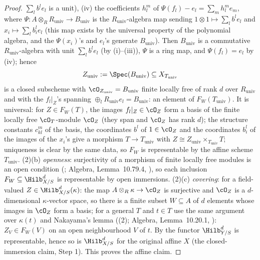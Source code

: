 \begin{proof}
$\sum_lb^le_l$ is a unit),
(iv) the coefficients $h^m_l$ of $\Psi(f_l)-e_l=\sum_mh^m_le_m$,
where $\Psi:A\otimes_RR_{\mathrm{univ}}\to B_{\mathrm{univ}}$ is the
$R_{\mathrm{univ}}$-algebra map sending $1\otimes1\mapsto\sum_lb^le_l$
and $x_i\mapsto\sum_lb^l_ie_l$ (this map exists by the universal
property of the polynomial algebra, and the
$\Psi(x_i)$'s and $e_l$'s generate $B_{\mathrm{univ}}$).
Then $B_{\mathrm{univ}}$ is a commutative $R_{\mathrm{univ}}$-algebra
with unit $\sum_lb^le_l$ (by (i)--(iii)), $\Psi$ is a ring map, and
$\Psi(f_l)=e_l$ by (iv); hence
\[
Z_{\mathrm{univ}}:=\Spec(B_{\mathrm{univ}})\subseteq
X_{T_{\mathrm{univ}}}
\]
is a closed subscheme with $\cO_{Z_{\mathrm{univ}}}=B_{\mathrm{univ}}$
finite locally free of rank $d$ over $R_{\mathrm{univ}}$ and with the
$f_l|_Z$'s spanning
$\oplus_lR_{\mathrm{univ}}e_l=B_{\mathrm{univ}}$: an element of
$F_W(T_{\mathrm{univ}})$.  It is universal: for $Z\in F_W(T)$, the
images $f_l|_Z\in\cO_Z$ form a basis of the finite locally free
$\cO_T$-module $\cO_Z$ (they span and $\cO_Z$ has rank $d$); the
structure constants $c^m_{kl}$ of the basis, the coordinates $b^l$ of
$1\in\cO_Z$ and the coordinates
$b^l_i$ of the images of the $x_i$'s give a morphism $T\to
T_{\mathrm{univ}}$ with $Z\cong Z_{\mathrm{univ}}\times_{T_{\mathrm{univ}}}T$;
uniqueness is clear by the same data, so $F_W$ is representable by the
affine scheme $T_{\mathrm{univ}}$.  (2)(b) \emph{openness}: surjectivity
of a morphism of finite locally free modules is an open condition
(; Algebra, Lemma~10.79.4,
), so each
inclusion $F_W\subseteq\Hilb^d_{X/S}$ is representable by open
immersions.  (2)(c) \emph{covering}: for a field-valued $Z\in
\Hilb^d_{X/S}(\kappa)$: the map $A\otimes_R\kappa\to\cO_Z$ is
surjective and $\cO_Z$ is a $d$-dimensional $\kappa$-vector space, so
there is a finite subset $W\subseteq A$ of $d$ elements whose images
in $\cO_Z$ form a basis; for a general $T$ and $t\in T$ use the same
argument over $\kappa(t)$ and Nakayama's lemma
((2); Algebra, Lemma~10.20.1,
): $Z_V\in
F_W(V)$ on an open neighbourhood $V$ of $t$.  By
 the functor $\Hilb^d_{Y/S}$ is
representable, hence so is $\Hilb^d_{X/S}$ for the original affine
$X$ (the closed-immersion claim, Step 1).  This proves the affine
claim.


\end{proof}
